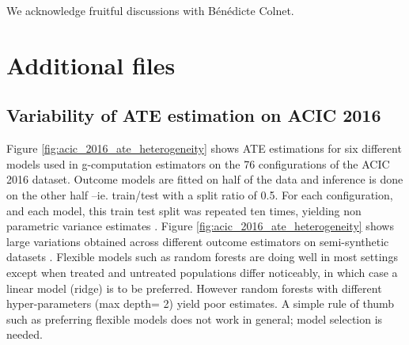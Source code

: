 \documentclass[a4paper,num-refs]{oup-contemporary}%
\begin{document}
We acknowledge fruitful discussions with Bénédicte Colnet.

\clearpage

\onecolumn
\setcounter{secnumdepth}{2}


\appendix
\section{Additional files}





\subsection{Variability of ATE estimation on ACIC
    2016}\label{apd:toy_example:acic_2016_ate_variability}

Figure \ref{fig:acic_2016_ate_heterogeneity} shows ATE estimations for six
different models used in g-computation estimators on the 76 configurations of
the ACIC 2016 dataset. Outcome models are fitted on half of the data and
inference is done on the other half --ie. train/test with a split ratio of 0.5.
For each configuration, and each model, this train test split was repeated ten
times, yielding non parametric variance estimates
\cite{bouthillier_accounting_2021}. Figure \ref{fig:acic_2016_ate_heterogeneity}
shows large variations obtained across different outcome estimators on
semi-synthetic datasets \cite{dorie_automated_2019}. Flexible models such as
random forests are doing well in most settings except when treated and untreated
populations differ noticeably, in which case a linear model (ridge) is to be
preferred. However random forests with different hyper-parameters (max depth= 2)
yield poor estimates. A simple rule of thumb such as preferring flexible models
does not work in general; model selection is needed.
\end{document}
